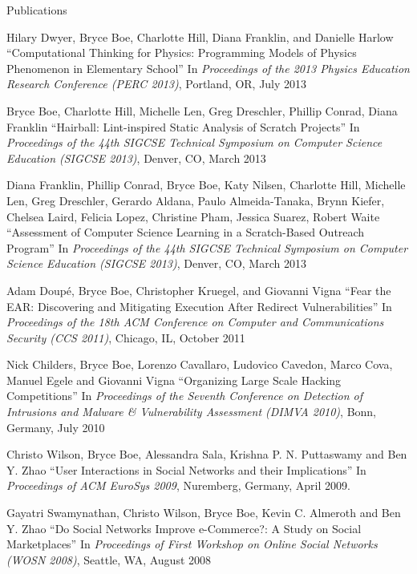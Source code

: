 \begin{vitae}
{\begin{vitaesection}{Publications}
\vspace{-0.1cm}
  \item Hilary Dwyer, Bryce Boe, Charlotte Hill, Diana Franklin, and Danielle
    Harlow ``Computational Thinking for Physics: Programming Models of Physics
    Phenomenon in Elementary School'' In \emph{Proceedings of the 2013 Physics
      Education Research Conference (PERC 2013)}, Portland, OR, July 2013
  \item Bryce Boe, Charlotte Hill, Michelle Len, Greg Dreschler, Phillip
    Conrad, Diana Franklin ``Hairball: Lint-inspired Static Analysis of Scratch
    Projects'' In \emph{Proceedings of the 44th SIGCSE Technical Symposium on
      Computer Science Education (SIGCSE 2013)}, Denver, CO, March 2013
  \item Diana Franklin, Phillip Conrad, Bryce Boe, Katy Nilsen, Charlotte Hill,
    Michelle Len, Greg Dreschler, Gerardo Aldana, Paulo Almeida-Tanaka, Brynn
    Kiefer, Chelsea Laird, Felicia Lopez, Christine Pham, Jessica Suarez,
    Robert Waite ``Assessment of Computer Science Learning in a Scratch-Based
    Outreach Program'' In \emph{Proceedings of the 44th SIGCSE Technical
      Symposium on Computer Science Education (SIGCSE 2013)}, Denver, CO, March
    2013
  \item Adam Doup\'e, Bryce Boe, Christopher Kruegel, and Giovanni Vigna ``Fear
    the EAR: Discovering and Mitigating Execution After Redirect
    Vulnerabilities'' In \emph{Proceedings of the 18th ACM Conference on
      Computer and Communications Security (CCS 2011)}, Chicago, IL, October
    2011
  \item Nick Childers, Bryce Boe, Lorenzo Cavallaro, Ludovico Cavedon, Marco
    Cova, Manuel Egele and Giovanni Vigna ``Organizing Large Scale Hacking
    Competitions'' In \emph{Proceedings of the Seventh Conference on Detection
      of Intrusions and Malware \& Vulnerability Assessment (DIMVA 2010)},
    Bonn, Germany, July 2010
  \item Christo Wilson, Bryce Boe, Alessandra Sala, Krishna P. N. Puttaswamy
    and Ben Y. Zhao ``User Interactions in Social Networks and their
    Implications'' In \emph{Proceedings of ACM EuroSys 2009}, Nuremberg,
    Germany, April 2009.
  \item Gayatri Swamynathan, Christo Wilson, Bryce Boe, Kevin C. Almeroth and
    Ben Y. Zhao ``Do Social Networks Improve e-Commerce?: A Study on Social
    Marketplaces'' In \emph{Proceedings of First Workshop on Online Social
      Networks (WOSN 2008)}, Seattle, WA, August 2008
\end{vitaesection}

}
\end{vitae}

